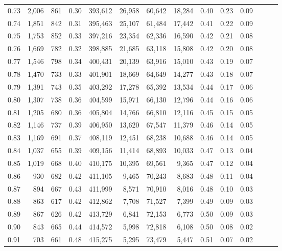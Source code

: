 \begin{tabular}{rrrrrrrrrrrrrr}
0.73 &  2,006 &    861 &  0.30 &  393,612 &   26,958 &  60,642 &  18,284 &  0.40 &  0.23 &      0.09 \\
0.74 &  1,851 &    842 &  0.31 &  395,463 &   25,107 &  61,484 &  17,442 &  0.41 &  0.22 &      0.09 \\
0.75 &  1,753 &    852 &  0.33 &  397,216 &   23,354 &  62,336 &  16,590 &  0.42 &  0.21 &      0.08 \\
0.76 &  1,669 &    782 &  0.32 &  398,885 &   21,685 &  63,118 &  15,808 &  0.42 &  0.20 &      0.08 \\
0.77 &  1,546 &    798 &  0.34 &  400,431 &   20,139 &  63,916 &  15,010 &  0.43 &  0.19 &      0.07 \\
0.78 &  1,470 &    733 &  0.33 &  401,901 &   18,669 &  64,649 &  14,277 &  0.43 &  0.18 &      0.07 \\
0.79 &  1,391 &    743 &  0.35 &  403,292 &   17,278 &  65,392 &  13,534 &  0.44 &  0.17 &      0.06 \\
0.80 &  1,307 &    738 &  0.36 &  404,599 &   15,971 &  66,130 &  12,796 &  0.44 &  0.16 &      0.06 \\
0.81 &  1,205 &    680 &  0.36 &  405,804 &   14,766 &  66,810 &  12,116 &  0.45 &  0.15 &      0.05 \\
0.82 &  1,146 &    737 &  0.39 &  406,950 &   13,620 &  67,547 &  11,379 &  0.46 &  0.14 &      0.05 \\
0.83 &  1,169 &    691 &  0.37 &  408,119 &   12,451 &  68,238 &  10,688 &  0.46 &  0.14 &      0.05 \\
0.84 &  1,037 &    655 &  0.39 &  409,156 &   11,414 &  68,893 &  10,033 &  0.47 &  0.13 &      0.04 \\
0.85 &  1,019 &    668 &  0.40 &  410,175 &   10,395 &  69,561 &   9,365 &  0.47 &  0.12 &      0.04 \\
0.86 &    930 &    682 &  0.42 &  411,105 &    9,465 &  70,243 &   8,683 &  0.48 &  0.11 &      0.04 \\
0.87 &    894 &    667 &  0.43 &  411,999 &    8,571 &  70,910 &   8,016 &  0.48 &  0.10 &      0.03 \\
0.88 &    863 &    617 &  0.42 &  412,862 &    7,708 &  71,527 &   7,399 &  0.49 &  0.09 &      0.03 \\
0.89 &    867 &    626 &  0.42 &  413,729 &    6,841 &  72,153 &   6,773 &  0.50 &  0.09 &      0.03 \\
0.90 &    843 &    665 &  0.44 &  414,572 &    5,998 &  72,818 &   6,108 &  0.50 &  0.08 &      0.02 \\
0.91 &    703 &    661 &  0.48 &  415,275 &    5,295 &  73,479 &   5,447 &  0.51 &  0.07 &      0.02 \\

\end{tabular}

